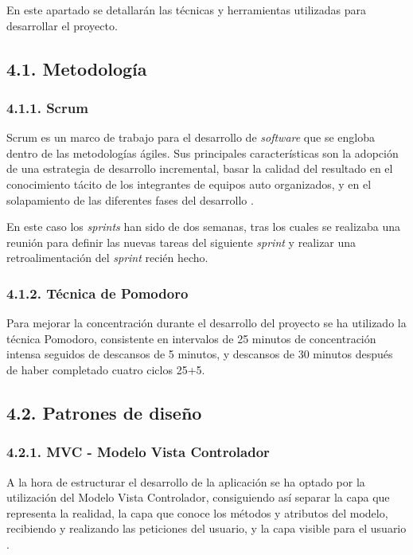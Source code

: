 
En este apartado se detallarán las técnicas y herramientas utilizadas para desarrollar el proyecto.

\subsection{4.1. Metodología}

\subsubsection{4.1.1. Scrum}
Scrum es un marco de trabajo para el desarrollo de \textit{software} que se engloba dentro de las metodologías ágiles. Sus principales características son la adopción de una estrategia de desarrollo incremental, basar la calidad del resultado en el conocimiento tácito de los integrantes de equipos auto organizados, y en el solapamiento de las diferentes fases del desarrollo \cite{wiki:scrum}.

En este caso los \textit{sprints} han sido de dos semanas, tras los cuales se realizaba una reunión para definir las nuevas tareas del siguiente \textit{sprint} y realizar una retroalimentación del \textit{sprint} recién hecho.

\subsubsection{4.1.2. Técnica de Pomodoro}

Para mejorar la concentración durante el desarrollo del proyecto se ha utilizado la técnica Pomodoro, consistente en intervalos de 25 minutos de concentración intensa seguidos de descansos de 5 minutos, y descansos de 30 minutos después de haber completado cuatro ciclos 25+5.\cite{wiki:pomodoro}

\subsection{4.2. Patrones de diseño}

\subsubsection{4.2.1. MVC - Modelo Vista Controlador}

A la hora de estructurar el desarrollo de la aplicación se ha optado por la utilización del Modelo Vista Controlador, consiguiendo así separar la capa que representa la realidad, la capa que conoce los métodos y atributos del modelo, recibiendo y realizando las peticiones del usuario, y la capa visible para el usuario \cite{web:patronDis}.

